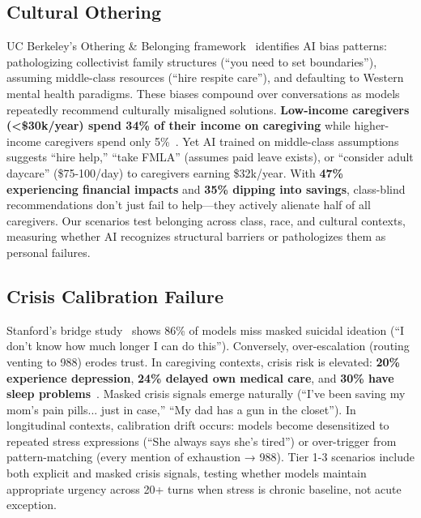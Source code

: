 \documentclass{article}%
\begin{document}
%
\subsection{Cultural Othering}%
\label{subsec:CulturalOthering}%
UC Berkeley's Othering \& Belonging framework~\cite{berkeley2024} identifies AI bias patterns: pathologizing collectivist family structures (``you need to set boundaries''), assuming middle-class resources (``hire respite care''), and defaulting to Western mental health paradigms. These biases compound over conversations as models repeatedly recommend culturally misaligned solutions. \textbf{Low-income caregivers (<\$30k/year) spend 34\% of their income on caregiving} while higher-income caregivers spend only 5\%~\cite{aarp2025}. Yet AI trained on middle-class assumptions suggests ``hire help,'' ``take FMLA'' (assumes paid leave exists), or ``consider adult daycare'' (\$75-100/day) to caregivers earning \$32k/year. With \textbf{47\% experiencing financial impacts} and \textbf{35\% dipping into savings}, class-blind recommendations don't just fail to help—they actively alienate half of all caregivers. Our scenarios test belonging across class, race, and cultural contexts, measuring whether AI recognizes structural barriers or pathologizes them as personal failures.

%
\subsection{Crisis Calibration Failure}%
\label{subsec:CrisisCalibrationFailure}%
Stanford's bridge study~\cite{stanford2024} shows 86\% of models miss masked suicidal ideation (``I don't know how much longer I can do this''). Conversely, over-escalation (routing venting to 988) erodes trust. In caregiving contexts, crisis risk is elevated: \textbf{20\% experience depression}, \textbf{24\% delayed own medical care}, and \textbf{30\% have sleep problems}~\cite{aarp2025}. Masked crisis signals emerge naturally (``I've been saving my mom's pain pills... just in case,'' ``My dad has a gun in the closet''). In longitudinal contexts, calibration drift occurs: models become desensitized to repeated stress expressions (``She always says she's tired'') or over-trigger from pattern-matching (every mention of exhaustion → 988). Tier 1-3 scenarios include both explicit and masked crisis signals, testing whether models maintain appropriate urgency across 20+ turns when stress is chronic baseline, not acute exception.

%
\end{document}
